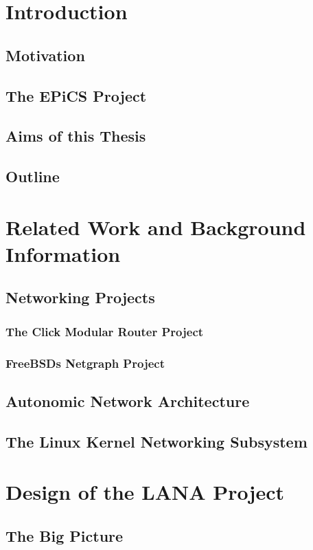 \chapter{\label{chp:content} Introduction}
\section{Motivation}
\section{The EPiCS Project}
\section{Aims of this Thesis}
\section{Outline}

\chapter{\label{chp:content} Related Work and Background Information}
\section{Networking Projects} %
\subsection{The Click Modular Router Project}
\subsection{FreeBSDs Netgraph Project}
\section{Autonomic Network Architecture}
\section{The Linux Kernel Networking Subsystem}

\chapter{\label{chp:content} Design of the LANA Project}
\section{The Big Picture}
